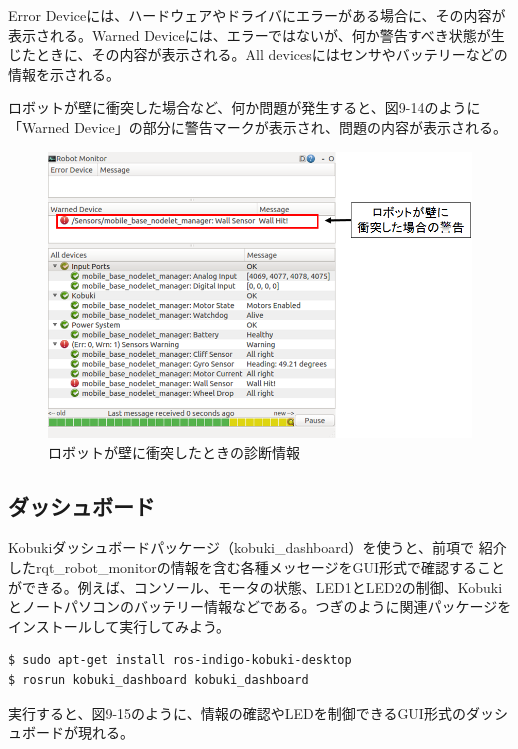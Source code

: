 \begin{itemize}
Error Deviceには、ハードウェアやドライバにエラーがある場合に、その内容が表示される。Warned Deviceには、エラーではないが、何か警告すべき状態が生じたときに、その内容が表示される。All devicesにはセンサやバッテリーなどの情報を示される。

ロボットが壁に衝突した場合など、何か問題が発生すると、図9-14のように「Warned Device」の部分に警告マークが表示され、問題の内容が表示される。

\begin{figure}[ht]
  \centering
  \includegraphics[width=\columnwidth]{pictures/chapter9/pic_09_14.png}
  \caption{ロボットが壁に衝突したときの診断情報}
\end{figure}

\subsection{ダッシュボード}

Kobukiダッシュボードパッケージ（kobuki\_dashboard）を使うと、前項で   紹介したrqt\_robot\_monitorの情報を含む各種メッセージをGUI形式で確認することができる。例えば、コンソール、モータの状態、LED1とLED2の制御、Kobukiとノートパソコンのバッテリー情報などである。つぎのように関連パッケージをインストールして実行してみよう。

\begin{lstlisting}[language=ROS]
$ sudo apt-get install ros-indigo-kobuki-desktop
$ rosrun kobuki_dashboard kobuki_dashboard
\end{lstlisting}

実行すると、図9-15のように、情報の確認やLEDを制御できるGUI形式のダッシュボードが現れる。


\end{itemize}
